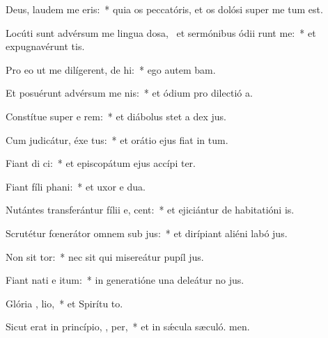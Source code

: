 \item Deus, laudem me  eris:~* quia os peccatóris, et os dolósi super me tum est.
\item Locúti sunt advérsum me lingua dosa,~\pscross{} et sermónibus ódii runt me:~* et expugnavérunt  tis.
\item Pro eo ut me dilígerent, de hi:~* ego autem bam.
\item Et posuérunt advérsum me   nis:~* et ódium pro dilectió a.
\item Constítue super e rem:~* et diábolus stet a dex jus.
\item Cum judicátur, éxe tus:~* et orátio ejus fiat in tum.
\item Fiant di  ci:~* et episcopátum ejus accípi ter.
\item Fiant fíli  phani:~* et uxor e dua.
\item Nutántes transferántur fílii e,  cent:~* et ejiciántur de habitatióni is.
\item Scrutétur fœnerátor omnem sub jus:~* et dirípiant aliéni labó jus.
\item Non sit  tor:~* nec sit qui misereátur pupíl jus.
\item Fiant nati e  itum:~* in generatióne una deleátur no jus.
\item Glória ,  lio,~* et Spirítu to.
\item Sicut erat in princípio,  ,  per,~* et in sǽcula sæculó. men.
